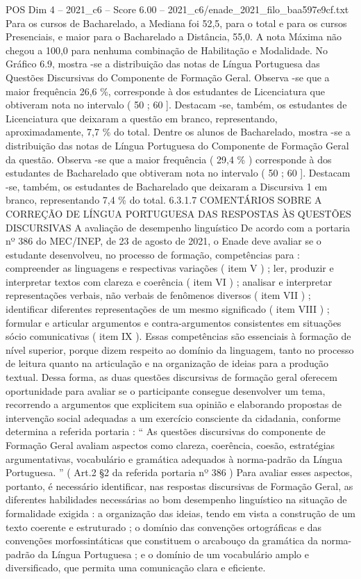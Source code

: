 \begin{textsample}{POS Dim 4 – 2021\_c6 – Score 6.00 – 2021\_c6/enade\_2021\_filo\_baa597e9cf.txt}
Para os cursos de Bacharelado, a Mediana foi 52,5, para o total e para os cursos Presenciais, e maior para o Bacharelado a Distância, 55,0.
A nota Máxima não chegou a 100,0 para nenhuma combinação de Habilitação e Modalidade.
No Gráfico 6.9, mostra -se a distribuição das notas de Língua Portuguesa das Questões Discursivas do Componente de Formação Geral.
Observa -se que a maior frequência 26,6 \%, corresponde à dos estudantes de Licenciatura que obtiveram nota no intervalo ( 50 ; 60 ].
Destacam -se, também, os estudantes de Licenciatura que deixaram a questão em branco, representando, aproximadamente, 7,7 \% do total.
Dentre os alunos de Bacharelado, mostra -se a distribuição das notas de Língua Portuguesa do Componente de Formação Geral da questão.
Observa -se que a maior frequência ( 29,4 \% ) corresponde à dos estudantes de Bacharelado que obtiveram nota no intervalo ( 50 ; 60 ].
Destacam -se, também, os estudantes de Bacharelado que deixaram a Discursiva 1 em branco, representando 7,4 \% do total. 6.3.1.7 COMENTÁRIOS SOBRE A CORREÇÃO DE LÍNGUA PORTUGUESA DAS RESPOSTAS ÀS QUESTÕES DISCURSIVAS A avaliação de desempenho linguístico De acordo com a portaria nº 386 do MEC/INEP, de 23 de agosto de 2021, o Enade deve avaliar se o estudante desenvolveu, no processo de formação, competências para : compreender as linguagens e respectivas variações ( item V ) ; ler, produzir e interpretar textos com clareza e coerência ( item VI ) ; analisar e interpretar representações verbais, não verbais de fenômenos diversos ( item VII ) ; identificar diferentes representações de um mesmo significado ( item VIII ) ; formular e articular argumentos e contra-argumentos consistentes em situações sócio comunicativas ( item IX ).
Essas competências são essenciais à formação de nível superior, porque dizem respeito ao domínio da linguagem, tanto no processo de leitura quanto na articulação e na organização de ideias para a produção textual.
Dessa forma, as duas questões discursivas de formação geral oferecem oportunidade para avaliar se o participante consegue desenvolver um tema, recorrendo a argumentos que explicitem sua opinião e elaborando propostas de intervenção social adequadas a um exercício consciente da cidadania, conforme determina a referida portaria : “ As questões discursivas do componente de Formação Geral avaliam aspectos como clareza, coerência, coesão, estratégias argumentativas, vocabulário e gramática adequados à norma-padrão da Língua Portuguesa. ” ( Art.2 §2 da referida portaria nº 386 ) Para avaliar esses aspectos, portanto, é necessário identificar, nas respostas discursivas de Formação Geral, as diferentes habilidades necessárias ao bom desempenho linguístico na situação de formalidade exigida : a organização das ideias, tendo em vista a construção de um texto coerente e estruturado ; o domínio das convenções ortográficas e das convenções morfossintáticas que constituem o arcabouço da gramática da norma-padrão da Língua Portuguesa ; e o domínio de um vocabulário amplo e diversificado, que permita uma comunicação clara e eficiente.

\end{textsample}
